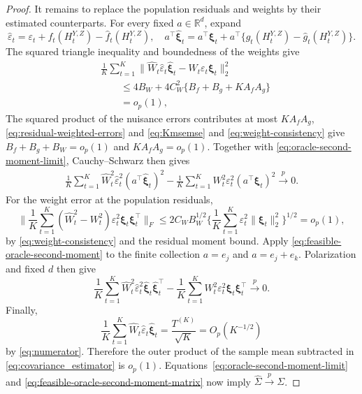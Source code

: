\documentclass[12pt]{article}
\numberwithin{equation}{section}
\begin{document}
\begin{proof}
It remains to replace the population residuals and weights by their estimated
counterparts. For every fixed \(a\in\mathbb R^d\), expand
\[
\hat\varepsilon_t
=
\varepsilon_t+
f_t(H_t^{Y,Z})-\hat f_t(H_t^{Y,Z}),
\quad
a^\top\hat{\boldsymbol\xi}_t
=
a^\top\boldsymbol\xi_t+
a^\top\{g_t(H_t^{Y,Z})-\hat g_t(H_t^{Y,Z})\}.
\]
The squared triangle inequality and boundedness of the weights give
\[
\begin{aligned}
&\frac1K\sum_{t=1}^K
\big\|\hat W_t\hat\varepsilon_t\hat{\boldsymbol\xi}_t
      -W_t\varepsilon_t\boldsymbol\xi_t\big\|_2^2\\
&\qquad\leq4B_W+4C_W^2\{B_f+B_g+K A_fA_g\}\\
&\qquad=o_p(1),
\end{aligned}
\]
The squared product of the nuisance errors contributes at most \(K A_fA_g\), \eqref{eq:residual-weighted-errors} and \eqref{eq:Kmsemse} and \eqref{eq:weight-consistency} give \(B_f+B_g+B_W=o_p(1)\) and \(K A_fA_g=o_p(1)\). Together with \eqref{eq:oracle-second-moment-limit}, Cauchy--Schwarz then gives
\begin{equation}
\label{eq:feasible-oracle-second-moment}
\begin{split}
\frac{1}{K}\sum_{t=1}^K
\hat W_t^2\hat\varepsilon_t^2
(a^\top\hat{\boldsymbol\xi}_t)^2
-
\frac{1}{K}\sum_{t=1}^K
W_t^2\varepsilon_t^2
(a^\top\boldsymbol\xi_t)^2
\xrightarrow{p}0.
\end{split}
\end{equation}
For the weight error at the population residuals,
\[
\Big\|\frac1K\sum_{t=1}^K(\hat W_t^2-W_t^2)
\varepsilon_t^2\boldsymbol\xi_t\boldsymbol\xi_t^\top\Big\|_F
\leq2C_W B_W^{1/2}
\Big\{\frac1K\sum_{t=1}^K\varepsilon_t^2\|\boldsymbol\xi_t\|_2^2\Big\}^{1/2}
=o_p(1),
\]
by \eqref{eq:weight-consistency} and the residual moment bound. Apply \eqref{eq:feasible-oracle-second-moment} to the finite collection
\(a=e_j\) and \(a=e_j+e_k\). Polarization and fixed \(d\) then give
\begin{equation}
\label{eq:feasible-oracle-second-moment-matrix}
\frac{1}{K}\sum_{t=1}^K
\hat W_t^2\hat\varepsilon_t^2
\hat{\boldsymbol\xi}_t\hat{\boldsymbol\xi}_t^\top
-
\frac{1}{K}\sum_{t=1}^K
W_t^2\varepsilon_t^2
\boldsymbol\xi_t\boldsymbol\xi_t^\top
\xrightarrow{p}0.
\end{equation}
Finally,
\[
\frac{1}{K}\sum_{t=1}^K
\hat W_t\hat\varepsilon_t\hat{\boldsymbol\xi}_t
=
\frac{T^{(K)}}{\sqrt K}
=O_p(K^{-1/2})
\]
by \eqref{eq:numerator}. Therefore the outer product of the sample mean
subtracted in \eqref{eq:covariance_estimator} is \(o_p(1)\).
Equations~\eqref{eq:oracle-second-moment-limit} and
\eqref{eq:feasible-oracle-second-moment-matrix} now imply
\(\hat\Sigma\xrightarrow{p}\Sigma\).
\end{proof}
\end{document}
